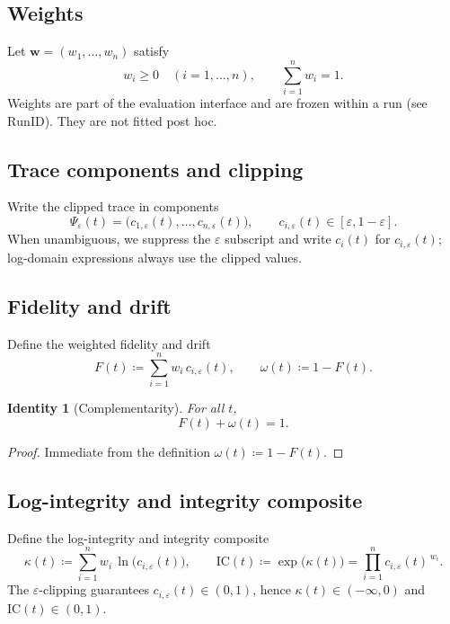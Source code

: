 \documentclass[
  aps,
  prd,
  preprint,
  superscriptaddress,
  nofootinbib,
  floatfix
]{revtex4-2}
\newcommand{\IC}{\mathrm{IC}}
\newtheorem{identity}[theorem]{Identity}
\begin{document}
\subsection{Weights}
Let $\bm{w}=(w_1,\dots,w_n)$ satisfy
\begin{equation}
  w_i \ge 0 \quad (i=1,\dots,n),
  \qquad
  \sum_{i=1}^n w_i = 1.
\end{equation}
Weights are part of the evaluation interface and are frozen within a run (see $\mathrm{RunID}$). They are not fitted post hoc.

\subsection{Trace components and clipping}
Write the clipped trace in components
\begin{equation}
  \Psi_\varepsilon(t) = \bigl(c_{1,\varepsilon}(t),\dots,c_{n,\varepsilon}(t)\bigr),
  \qquad
  c_{i,\varepsilon}(t)\in[\varepsilon,1-\varepsilon].
\end{equation}
When unambiguous, we suppress the $\varepsilon$ subscript and write $c_i(t)$ for $c_{i,\varepsilon}(t)$; log-domain expressions
always use the clipped values.

\subsection{Fidelity and drift}
Define the weighted fidelity and drift
\begin{equation}
  F(t) \coloneqq \sum_{i=1}^n w_i\,c_{i,\varepsilon}(t),
  \qquad
  \omega(t) \coloneqq 1 - F(t).
\end{equation}

\begin{identity}[Complementarity]
\label{id:complementarity}
For all $t$,
\begin{equation}
  F(t)+\omega(t)=1.
\end{equation}
\end{identity}

\begin{proof}
Immediate from the definition $\omega(t)\coloneqq 1-F(t)$.
\end{proof}

\subsection{Log-integrity and integrity composite}
Define the log-integrity and integrity composite
\begin{equation}
  \kappa(t) \coloneqq \sum_{i=1}^n w_i\,\ln\!\bigl(c_{i,\varepsilon}(t)\bigr),
  \qquad
  \IC(t) \coloneqq \exp\!\bigl(\kappa(t)\bigr)
  = \prod_{i=1}^n c_{i,\varepsilon}(t)^{\,w_i}.
\end{equation}
The $\varepsilon$-clipping guarantees $c_{i,\varepsilon}(t)\in(0,1)$, hence $\kappa(t)\in(-\infty,0)$ and $\IC(t)\in(0,1)$.
\end{document}
